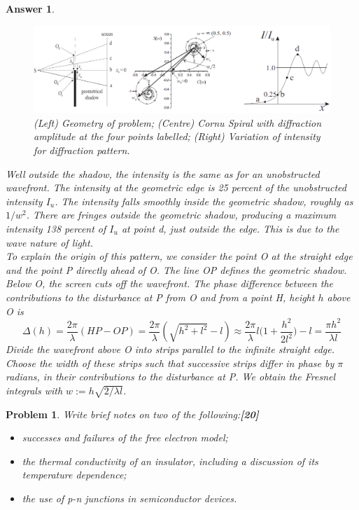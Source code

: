 \documentclass[a4paper]{article}
\newtheorem{ans}{Answer}[subsection]
\theoremstyle{new}
\newtheorem{qns}{Problem}[subsection]
\begin{document}
\begin{ans}
\begin{figure}[H]
    \centering
    \includegraphics[width=\linewidth]{fresneledge.PNG}
    \caption{(Left) Geometry of problem; (Centre) Cornu Spiral with diffraction amplitude at the four points labelled; (Right) Variation of intensity for diffraction pattern.}
\end{figure}
Well outside the shadow, the intensity is the same as for an unobstructed wavefront. The intensity at the geometric edge is 25 percent of the unobstructed intensity $I_u$. The intensity falls smoothly inside the geometric shadow, roughly as $1/w^2$. There are fringes outside the geometric shadow, producing a maximum intensity 138 percent of $I_u$ at point d, just outside the edge. This is due to the wave nature of light.\\[5pt]
To explain the origin of this pattern, we consider the point O at the straight edge and the point P directly ahead of O. The line OP defines the geometric shadow. Below O, the screen cuts off the wavefront. The phase difference between the contributions to the disturbance at P from O and from a point H, height $h$ above O is
$$\Delta(h)=\frac{2\pi}{\lambda}(HP-OP)=\frac{2\pi}{\lambda}(\sqrt{h^2+l^2}-l)\approx\frac{2\pi}{\lambda}l\bigg(1+\frac{h^2}{2l^2}\bigg)-l=\frac{\pi h^2}{\lambda l}$$
Divide the wavefront above O into strips parallel to the infinite straight edge. Choose the width of these strips such that successive strips differ in phase by $\pi$ radians, in their contributions to the disturbance at P. We obtain the Fresnel integrals with $w:=h\sqrt{2/\lambda l}$.
\end{ans}
\newpage
\begin{qns}
Write brief notes on two of the following:\hfill\textbf{[20]}
\begin{itemize}
    \item successes and failures of the free electron model;
    \item the thermal conductivity of an insulator, including a discussion of its temperature dependence; 
    \item  the use of p-n junctions in semiconductor devices.
\end{itemize}
\end{qns}
\end{document}
